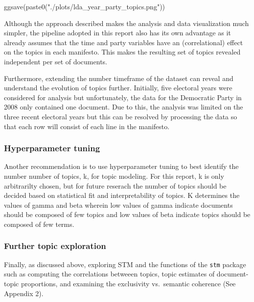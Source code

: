 \documentclass[
]{article}
\newenvironment{Shaded}{\begin{snugshade}}{\end{snugshade}}
\newcommand{\FunctionTok}[1]{\textcolor[rgb]{0.00,0.00,0.00}{#1}}
\newcommand{\NormalTok}[1]{#1}
\newcommand{\StringTok}[1]{\textcolor[rgb]{0.31,0.60,0.02}{#1}}
\begin{document}
\begin{Shaded}
\begin{Highlighting}[]
\FunctionTok{ggsave}\NormalTok{(}\FunctionTok{paste0}\NormalTok{(}\StringTok{"./plots/lda\_year\_party\_topics.png"}\NormalTok{))}
\end{Highlighting}
\end{Shaded}

Although the approach described makes the analysis and data
visualization much simpler, the pipeline adopted in this report also has
its own advantage as it already assumes that the time and party
variables have an (correlational) effect on the topics in each
manifesto. This makes the resulting set of topics revealed independent
per set of documents.

Furthermore, extending the number timeframe of the dataset can reveal
and understand the evolution of topics further. Initially, five
electoral years were considered for analysis but unfortunately, the data
for the Democratic Party in 2008 only contained one document. Due to
this, the analysis was limited on the three recent electoral years but
this can be resolved by processing the data so that each row will
consist of each line in the manifesto.

\hypertarget{hyperparameter-tuning}{%
\subsubsection{Hyperparameter tuning}\label{hyperparameter-tuning}}

Another recommendation is to use hyperparameter tuning to best identify
the number number of topics, k, for topic modeling. For this report, k
is only arbitrarilty chosen, but for future reserach the number of
topics should be decided based on statistical fit and interpretability
of topics. K determines the values of gamma and beta wherein low values
of gamma indicate documents should be composed of few topics and low
values of beta indicate topics should be composed of few terms.

\hypertarget{further-topic-exploration}{%
\subsubsection{Further topic
exploration}\label{further-topic-exploration}}

Finally, as discussed above, exploring STM and the functions of the
\texttt{stm} package such as computing the correlations betweeen topics,
topic estimates of document-topic proportions, and examining the
exclusivity vs.~semantic coherence (See Appendix 2).
\end{document}
